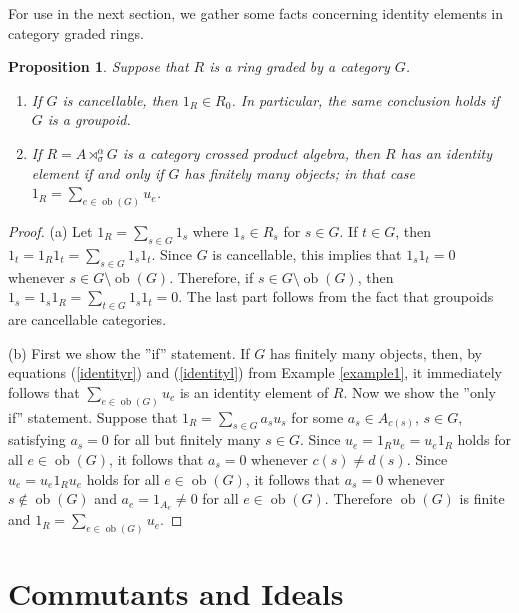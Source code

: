 \documentclass[11pt,leqno]{amsart}
\theoremstyle{plain}
\newtheorem{prop}{Proposition}
\theoremstyle{definition}
\DeclareMathOperator{\ob}{ob}
\begin{document}
For use in the next section, we gather some facts
concerning identity elements in category graded rings.

\begin{prop}\label{identityprop}
Suppose that $R$ is a ring graded by a category $G$.
\begin{enumerate}[{\rm (a)}]
\item If $G$ is cancellable, then $1_R \in R_0$.
In particular, the same conclusion holds if $G$ is a groupoid.

\item If $R = A \rtimes_{\sigma}^{\alpha} G$ is
a category crossed product algebra, then $R$ has an identity
element if and only if $G$ has finitely many objects;
in that case $1_R = \sum_{e \in \ob(G)} u_e$.
\end{enumerate}
\end{prop}

\begin{proof}
(a) Let $1_R=\sum_{s\in G}1_s$ where $1_s \in R_s$ for $s\in G$. If $t \in G$, then
$1_t = 1_R 1_t = \sum_{s \in G} 1_s 1_t$.
Since $G$ is cancellable, this implies that
$1_s 1_t = 0$ whenever $s \in G \setminus \ob(G)$.
Therefore, if $s \in G \setminus \ob(G)$, then
$1_s = 1_s 1_R = \sum_{t \in G} 1_s 1_t = 0$.
The last part follows from the fact that groupoids
are cancellable categories.

(b) First we show the ''if'' statement.
If $G$ has finitely many objects, then,
by equations (\ref{identityr}) and (\ref{identityl})
from Example \ref{example1}, it
immediately follows that $\sum_{e \in \ob(G)} u_e$
is an identity element of $R$.
Now we show the ''only if'' statement.
Suppose that $1_R = \sum_{s \in G} a_s u_s$
for some $a_s \in A_{c(s)}$, $s \in G$,
satisfying $a_s = 0$ for all but finitely
many $s \in G$. Since $u_e = 1_R u_e = u_e 1_R$
holds for all $e \in \ob(G)$, it follows
that $a_s = 0$ whenever $c(s) \neq d(s)$.
Since $u_e = u_e 1_R u_e$ holds for all
$e \in \ob(G)$, it follows that
$a_s = 0$ whenever $s \notin \ob(G)$
and $a_e = 1_{A_e} \neq 0$ for all $e \in \ob(G)$.
Therefore $\ob(G)$ is finite
and $1_R = \sum_{e \in \ob(G)} u_e$.
\end{proof}




\section{Commutants and Ideals}\label{ideals}
\end{document}
